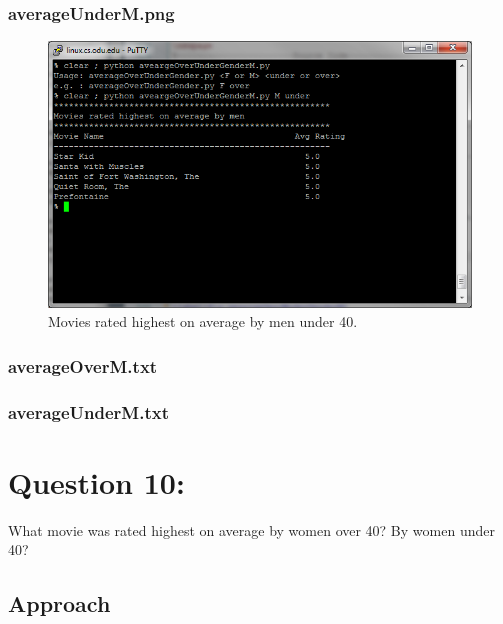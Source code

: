 \documentclass[12pt]{article}
\begin{document}
\subsubsection{averageUnderM.png}
\begin{figure}[ht]
\includegraphics[scale=1.0]{../Q9/averageUnderM}
\centering
\caption{Movies rated highest on average by men under 40.}
\label{fig:averageUnderM}
\end{figure}
\newpage
\subsubsection{averageOverM.txt}

\newpage
\subsubsection{averageUnderM.txt}

\newpage
\section{Question 10:}
What movie was rated highest on average by women over 40? By
women under 40?
\subsection{Approach}
\end{document}
